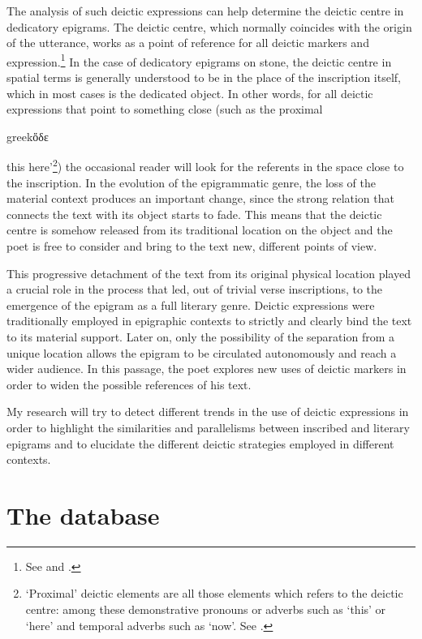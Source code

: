 \documentclass[amsthm,ebook]{saparticle}
\begin{document}
The analysis of such deictic expressions can help determine the deictic centre in dedicatory epigrams. The deictic
centre, which normally coincides with the origin of the utterance, works as a point of reference for all deictic
markers and expression.\footnote{See \citet[102f.]{buhler_sprachtheorie:_1982} and \citet[63f.]{levinson_pragmatics_1983}.} In the case of dedicatory
epigrams on stone, the deictic centre in spatial terms is generally understood to be in the place of the inscription
itself, which in most cases is the dedicated object. In other words, for all deictic expressions that point to
something close (such as the proximal \begin{otherlanguage*}{greek}ὅδε\end{otherlanguage*} this here'\footnote{ `Proximal' deictic elements are all those
elements which refers to the deictic centre: among these demonstrative pronouns or adverbs such as `this' or `here' and
temporal adverbs such as `now'. See \citet[2408f.]{diessel_deixis_2012}.}) the occasional reader will look for the referents in the
space close to the inscription. In the evolution of the epigrammatic genre, the loss of the material context produces
an important change, since the strong relation that connects the text with its object starts to fade. This means that
the deictic centre is somehow released from its traditional location on the object and the poet is free to consider and
bring to the text new, different points of view. 

This progressive detachment of the text from its original physical location played a crucial role in the process
that led, out of trivial verse inscriptions, to the emergence of the epigram as a full literary genre. Deictic
expressions were traditionally employed in epigraphic contexts to strictly and clearly bind the text to its material
support. Later on, only the possibility of the separation from a unique location allows the epigram to be circulated
autonomously and reach a wider audience. In this passage, the poet explores new uses of deictic markers in order to
widen the possible references of his text. 

My research will try to detect different trends in the use of deictic expressions in order to highlight the similarities
and parallelisms between inscribed and literary epigrams and to elucidate the different deictic strategies employed in
different contexts.

\section{The database}
\end{document}

